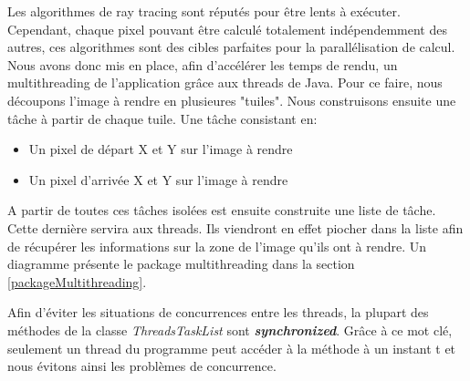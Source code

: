 \documentclass[../../Rapport RayTracer.tex]{subfiles}
\begin{document}
\label{multithreading}
Les algorithmes de ray tracing sont réputés pour être lents à exécuter. Cependant, chaque pixel pouvant être calculé totalement indépendemment des autres, ces algorithmes sont des cibles parfaites pour la parallélisation de calcul. Nous avons donc mis en place, afin d'accélérer les temps de rendu, un multithreading de l'application grâce aux threads de Java. Pour ce faire, nous découpons l'image à rendre en plusieures "tuiles". Nous construisons ensuite une tâche à partir de chaque tuile. Une tâche consistant en:
\begin{itemize}
	\item{Un pixel de départ X et Y sur l'image à rendre}	
	\item{Un pixel d'arrivée X et Y sur l'image à rendre}
\end{itemize}
A partir de toutes ces tâches isolées est ensuite construite une liste de tâche. Cette dernière servira aux threads. Ils viendront en effet piocher dans la liste afin de récupérer les informations sur la zone de l'image qu'ils ont à rendre.
Un diagramme présente le package multithreading dans la section \ref{packageMultithreading}.

Afin d'éviter les situations de concurrences entre les threads, la plupart des méthodes de la classe \textit{ThreadsTaskList} sont \textit{\textbf{synchronized}}. Grâce à ce mot clé, seulement un thread du programme peut accéder à la méthode à un instant t et nous évitons ainsi les problèmes de concurrence.
\end{document}
